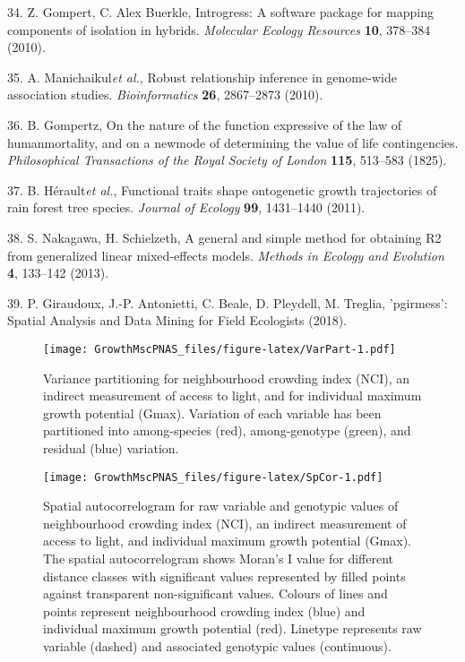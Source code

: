 \documentclass[
]{article}
\begin{document}
\leavevmode\hypertarget{ref-Gompert2010}{}%
34. Z. Gompert, C. Alex Buerkle, Introgress: A software package for mapping components of isolation in hybrids. \emph{Molecular Ecology Resources} \textbf{10}, 378--384 (2010).

\leavevmode\hypertarget{ref-Manichaikul2010}{}%
35. A. Manichaikul\emph{et al.}, Robust relationship inference in genome-wide association studies. \emph{Bioinformatics} \textbf{26}, 2867--2873 (2010).

\leavevmode\hypertarget{ref-Gompertz1825}{}%
36. B. Gompertz, On the nature of the function expressive of the law of humanmortality, and on a newmode of determining the value of life contingencies. \emph{Philosophical Transactions of the Royal Society of London} \textbf{115}, 513--583 (1825).

\leavevmode\hypertarget{ref-Herault2011}{}%
37. B. Hérault\emph{et al.}, Functional traits shape ontogenetic growth trajectories of rain forest tree species. \emph{Journal of Ecology} \textbf{99}, 1431--1440 (2011).

\leavevmode\hypertarget{ref-Nakagawa2013}{}%
38. S. Nakagawa, H. Schielzeth, A general and simple method for obtaining R2 from generalized linear mixed-effects models. \emph{Methods in Ecology and Evolution} \textbf{4}, 133--142 (2013).

\leavevmode\hypertarget{ref-Giraudoux2018}{}%
39. P. Giraudoux, J.-P. Antonietti, C. Beale, D. Pleydell, M. Treglia, 'pgirmess': Spatial Analysis and Data Mining for Field Ecologists (2018).

\newpage

\begin{figure}
\centering
\texttt{[image: GrowthMscPNAS\_files/figure-latex/VarPart-1.pdf]}
\caption{\label{fig:VarPart}Variance partitioning for neighbourhood crowding index (NCI), an indirect measurement of access to light, and for individual maximum growth potential (Gmax). Variation of each variable has been partitioned into among-species (red), among-genotype (green), and residual (blue) variation.}
\end{figure}

\newpage

\begin{figure}
\centering
\texttt{[image: GrowthMscPNAS\_files/figure-latex/SpCor-1.pdf]}
\caption{\label{fig:SpCor}Spatial autocorrelogram for raw variable and genotypic values of neighbourhood crowding index (NCI), an indirect measurement of access to light, and individual maximum growth potential (Gmax). The spatial autocorrelogram shows Moran's I value for different distance classes with significant values represented by filled points against transparent non-significant values. Colours of lines and points represent neighbourhood crowding index (blue) and individual maximum growth potential (red). Linetype represents raw variable (dashed) and associated genotypic values (continuous).}
\end{figure}
\end{document}
